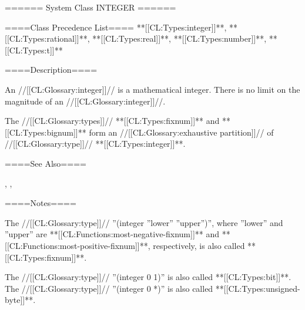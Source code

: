 ====== System Class INTEGER ======

====Class Precedence List==== **[[CL:Types:integer]]**, **[[CL:Types:rational]]**, **[[CL:Types:real]]**, **[[CL:Types:number]]**, **[[CL:Types:t]]**

====Description====

An //[[CL:Glossary:integer]]// is a mathematical integer. There is no limit on the magnitude of an //[[CL:Glossary:integer]]//.

The //[[CL:Glossary:types]]// **[[CL:Types:fixnum]]** and **[[CL:Types:bignum]]** form an //[[CL:Glossary:exhaustive partition]]// of //[[CL:Glossary:type]]// **[[CL:Types:integer]]**.


====See Also====

{\figref\SyntaxForNumericTokens}, {\secref\NumsFromTokens}, {\secref\PrintingIntegers}

====Notes====

The //[[CL:Glossary:type]]// ''(integer ''lower'' ''upper'')'', where ''lower'' and ''upper'' are **[[CL:Functions:most-negative-fixnum]]** and **[[CL:Functions:most-positive-fixnum]]**, respectively, is also called **[[CL:Types:fixnum]]**.

The //[[CL:Glossary:type]]// ''(integer 0 1)'' is also called **[[CL:Types:bit]]**. The //[[CL:Glossary:type]]// ''(integer 0 *)'' is also called **[[CL:Types:unsigned-byte]]**.

 
